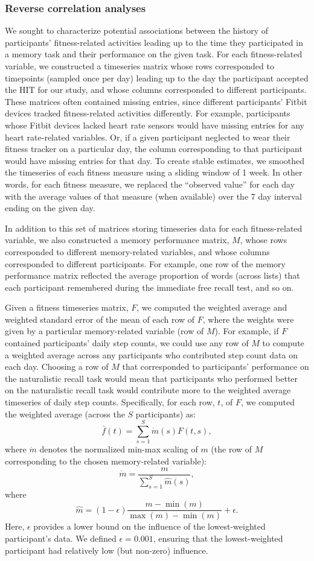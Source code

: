 \documentclass[10pt]{article}
\begin{document}
\subsubsection*{Reverse correlation analyses}
We sought to characterize potential associations between the history
of participants' fitness-related activities leading up to the time
they participated in a memory task and their performance on the given
task.  For each fitness-related variable, we constructed a timeseries
matrix whose rows corresponded to timepoints (sampled once per day)
leading up to the day the participant accepted the HIT for our study,
and whose columns corresponded to different participants.  These
matrices often contained missing entries, since different
participants' Fitbit devices tracked fitness-related activities
differently.  For example, participants whose Fitbit devices lacked
heart rate sensors would have missing entries for any heart
rate-related variables.  Or, if a given participant neglected to wear
their fitness tracker on a particular day, the column corresponding to
that participant would have missing entries for that day.  To create
stable estimates, we smoothed the timeseries of each fitness measure
using a sliding window of 1 week.  In other words, for each fitness
measure, we replaced the ``observed
value'' for each day with the average values of that measure (when
available) over the 7 day interval ending on the given day.

In addition to this set of matrices storing timeseries data for each
fitness-related variable, we also constructed a memory performance
matrix, $M$, whose rows corresponded to different memory-related
variables, and whose columns corresponded to different participants.
For example, one row of the memory performance matrix reflected the
average proportion of words (across lists) that each participant
remembered during the immediate free recall test, and so on.

Given a fitness timeseries matrix, $F$, we computed the weighted
average and weighted standard error of the mean of each row of $F$,
where the weights were given by a particular memory-related variable
(row of $M$).  For example, if $F$ contained participants' daily step
counts, we could use any row of $M$ to compute a weighted average
across any participants who contributed step count data on each day.
Choosing a row of $M$ that corresponded to participants' performance
on the naturalistic recall task would mean that participants who
performed better on the naturalistic recall task would contribute more
to the weighted average timeseries of daily step counts.
Specifically, for each row, $t$, of $F$, we computed the weighted
average (across the $S$ participants) as:
\[
\bar{f}(t) = \sum_{s=1}^S \dot{m}(s) F(t, s),
\]
where $\dot{m}$ denotes the normalized min-max scaling of $m$ (the row
of $M$ corresponding to the chosen memory-related variable):
\[
  \dot{m} = \frac{m}{\sum_{s=1}^S \hat{m}(s)},
\]
where
\[
  \hat{m} = (1 - \epsilon)\frac{m - \min(m)}{\max(m) - \min(m)} + \epsilon.
\]
Here, $\epsilon$ provides a lower bound on the influence of the
lowest-weighted participant's data.  We defined $\epsilon = 0.001$,
ensuring that the lowest-weighted participant had relatively low (but
non-zero) influence.
\end{document}
